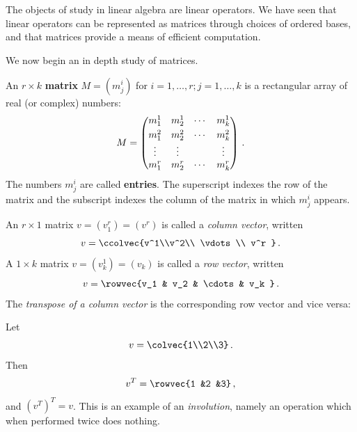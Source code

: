 


\section{\propMatricesTitle} \label{properties_matrices}

The objects of study in linear algebra are linear operators. 
We have seen that linear operators can be represented as matrices through choices of ordered bases, and that matrices provide a means of efficient computation. 

We now begin an in depth study of matrices.

\begin{definition}
An $r\times k$ {\bf matrix} $M=(m^i_j)$ for $i=1, \ldots, r; j=1, \ldots, k$ is a rectangular array of real (or complex) numbers:
\label{matrixnotation}
\[M = 
\begin{pmatrix}
m_1^1 & m_2^1 & \cdots & m_k^1 \\[1mm]
m_1^2 & m_2^2 & \cdots & m_k^2 \\
\multicolumn{1}{c}{\vdots} & \multicolumn{1}{c}{\vdots} &   & \multicolumn{1}{c}{\vdots} \\
m_1^r & m_2^r & \cdots & m_k^r \\
\end{pmatrix}\, .
\]
The numbers $m^i_j$ are called {\bf entries}.  The superscript indexes the row of the matrix and the subscript indexes the column of the matrix in which $m_j^i$ appears.
\end{definition}


An $r\times 1$ matrix $v = (v^r_1) = (v^r)$ is called a \emph{column vector}, written $$v = \ccolvec{v^1\\v^2\\ \vdots \\ v^r }\, .$$  A $1\times k$ matrix $v = (v^1_k) = (v_k)$ is called a \emph{row vector}, written $$v = \rowvec{v_1 & v_2 & \cdots & v_k }\, .$$  
The {\it transpose of a column vector} is the corresponding row vector and vice versa:

\begin{example}
Let 
$$
v=\colvec{1\\2\\3}\, .
$$
Then
$$
v^T=\rowvec{1 &2 &3}\, ,
$$
and $(v^T)^T=v$. This is an example of an {\it involution}, namely an operation which when performed twice does nothing.
\end{example}

